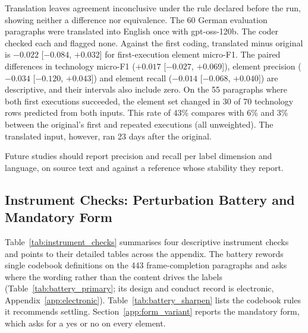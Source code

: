 Translation leaves agreement inconclusive under the rule declared before the run, showing neither a difference nor equivalence. The 60 German evaluation paragraphs were translated into English once with gpt-oss-120b. The coder checked each and flagged none. Against the first coding, translated minus original is $-0.022$ [$-0.084$, $+0.032$] for first-execution element micro-F1. The paired differences in technology micro-F1 ($+0.017$ [$-0.027$, $+0.069$]), element precision ($-0.034$ [$-0.120$, $+0.043$]) and element recall ($-0.014$ [$-0.068$, $+0.040$]) are descriptive, and their intervals also include zero. On the 55 paragraphs where both first executions succeeded, the element set changed in 30 of 70 technology rows predicted from both inputs. This rate of 43\% compares with 6\% and 3\% between the original's first and repeated executions (all unweighted). The translated input, however, ran 23 days after the original.

Future studies should report precision and recall per label dimension and language, on source text and against a reference whose stability they report.

\appfloatbarrier

\subsection{Instrument Checks: Perturbation Battery and Mandatory Form}\label{app:battery}

Table~\ref{tab:instrument_checks} summarises four descriptive instrument checks and points to their detailed tables across the appendix. The battery rewords single codebook definitions on the 443 frame-completion paragraphs and asks where the wording rather than the content drives the labels (Table~\ref{tab:battery_primary}; its design and conduct record is electronic, Appendix~\ref{app:electronic}). Table~\ref{tab:battery_sharpen} lists the codebook rules it recommends settling. Section~\ref{app:form_variant} reports the mandatory form, which asks for a yes or no on every element.



\begingroup{}\endgroup

